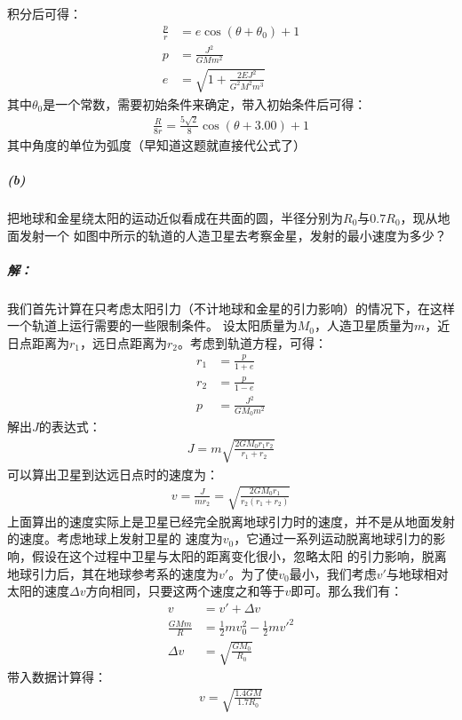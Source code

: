 \documentclass[a4paper]{ctexart}
\begin{document}
    积分后可得：
    \begin{align}
        \frac{p}{r} &= e\cos(\theta + \theta_{0}) + 1\\
        p &= \frac{J^{2}}{GMm^{2}}\\
        e &= \sqrt{1 + \frac{2EJ^{2}}{G^{2}M^{2}m^{3}}}
    \end{align}
    其中$\theta_{0}$是一个常数，需要初始条件来确定，带入初始条件后可得：
    \begin{align}
        \frac{R}{8r} = \frac{5\sqrt{2}}{8}\cos(\theta + 3.00) + 1
    \end{align}
    其中角度的单位为弧度（早知道这题就直接代公式了）
    \subparagraph{(b)}
    把地球和金星绕太阳的运动近似看成在共面的圆，半径分别为$R_{0}$与$0.7R_{0}$，现从地面发射一个
    如图中所示的轨道的人造卫星去考察金星，发射的最小速度为多少？
    \subparagraph{解：}
    我们首先计算在只考虑太阳引力（不计地球和金星的引力影响）的情况下，在这样一个轨道上运行需要的一些限制条件。
    设太阳质量为$M_{0}$，人造卫星质量为$m$，近日点距离为$r_{1}$，远日点距离为$r_{2}$。考虑到轨道方程，可得：
    \begin{align}
        r_{1} &= \frac{p}{1 + e}\\
        r_{2} &= \frac{p}{1 - e}\\
        p &= \frac{J^{2}}{GM_{0}m^{2}}
    \end{align}
    解出$J$的表达式：
    \begin{align}
        J = m\sqrt{\frac{2GM_{0}r_{1}r_{2}}{r_{1} + r_{2}}}
    \end{align}
    可以算出卫星到达远日点时的速度为：
    \begin{align}
        v = \frac{J}{mr_{2}} = \sqrt{\frac{2GM_{0}r_{1}}{r_{2}(r_{1} + r_{2})}}
    \end{align}
    上面算出的速度实际上是卫星已经完全脱离地球引力时的速度，并不是从地面发射的速度。考虑地球上发射卫星的
    速度为$v_{0}$，它通过一系列运动脱离地球引力的影响，假设在这个过程中卫星与太阳的距离变化很小，忽略太阳
    的引力影响，脱离地球引力后，其在地球参考系的速度为$v'$。为了使$v_{0}$最小，我们考虑$v'$与地球相对
    太阳的速度$\Delta v$方向相同，只要这两个速度之和等于$v$即可。那么我们有：
    \begin{align}
        v &= v' + \Delta v\\
        \frac{GMm}{R} &= \frac{1}{2}mv_{0}^{2} - \frac{1}{2}mv'^{2}\\
        \Delta v &= \sqrt{\frac{GM_{0}}{R_{0}}}
    \end{align}
    带入数据计算得：
    \begin{align}
        v = \sqrt{\frac{1.4GM}{1.7R_{0}}}
    \end{align}
\end{document}
